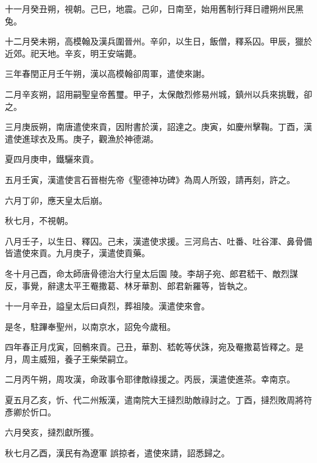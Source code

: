 \begin{pinyinscope}
 十一月癸丑朔，視朝。己巳，地震。己卯，日南至，始用舊制行拜日禮朔州民黑兔。



 十二月癸未朔，高模翰及漢兵圍晉州。辛卯，以生日，飯僧，釋系囚。甲辰，獵於近郊。祀天地。辛亥，明王安端薨。



 三年春閏正月壬午朔，漢以高模翰卻周軍，遣使來謝。



 二月辛亥朔，詔用嗣聖皇帝舊璽。甲子，太保敵烈修易州城，鎮州以兵來挑戰，卻之。



 三月庚辰朔，南唐遣使來貢，因附書於漢，詔達之。庚寅，如慶州擊鞠。丁酉，漢遣使進球衣及馬。庚子，觀漁於神德湖。



 夏四月庚申，鐵驪來貢。



 五月壬寅，漢遣使言石晉樹先帝《聖德神功碑》為周人所毀，請再刻，許之。



 六月丁卯，應天皇太后崩。



 秋七月，不視朝。



 八月壬子，以生日、釋囚。己未，漢遣使求援。三河烏古、吐番、吐谷渾、鼻骨備皆遣使來貢。九月庚子，漢遣使貢藥。



 冬十月己酉，命太師唐骨德治大行皇太后園
 陵。李胡子宛、郎君嵇干、敵烈謀反，事覺，辭逮太平王罨撒葛、林牙華割、郎君新羅等，皆執之。



 十一月辛丑，謚皇太后曰貞烈，葬祖陵。漢遣使來會。



 是冬，駐蹕奉聖州，以南京水，詔免今歲租。



 四年春正月戊寅，回鶻來貢。己丑，華割、嵇乾等伏誅，宛及罨撒葛皆釋之。是月，周主威殂，養子王柴榮嗣立。



 二月丙午朔，周攻漢，命政事令耶律敵祿援之。丙辰，漢遣使進茶。幸南京。



 夏五月乙亥，忻、代二州叛漢，遣南院大王撻烈助敵祿討之。丁酉，撻烈敗周將符彥卿於忻口。



 六月癸亥，撻烈獻所獲。



 秋七月乙酉，漢民有為遼軍
 誤掠者，遣使來請，詔悉歸之。




\end{pinyinscope}
